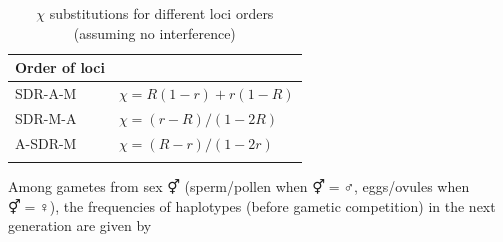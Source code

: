 \documentclass[12pt]{article}
\begin{document}
\begin{table}[ht]
\centering
\smallskip
\caption{$\chi$ substitutions for different loci orders (assuming no interference)}
\begin{tabular}{l l}
\hline\hline
  Order of loci &   \\ [0.5ex] \hline
  SDR-A-M & $\chi=R(1-r)+r(1-R)$  \\
  SDR-M-A & $\chi=(r-R)/(1-2R)$ \\
  A-SDR-M & $\chi=(R-r)/(1-2r)$ \\
  \hline \hline
  \label{tab:chisubstitutions}
 \end{tabular}
\end{table}

Among gametes from sex $\Hermaphrodite$ (sperm/pollen when $\Hermaphrodite=\male$, eggs/ovules when $\Hermaphrodite=\female$), the frequencies of haplotypes (before gametic competition) in the next generation are given by
\end{document}
